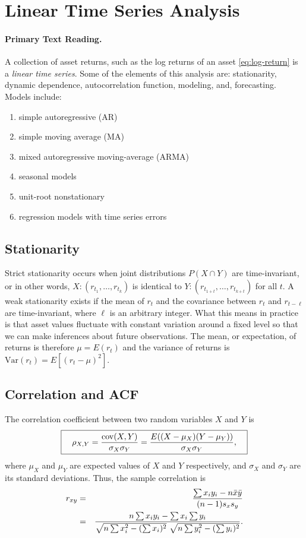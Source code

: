 \section{Linear Time Series Analysis}
\paragraph{Primary Text Reading.} 

A collection of asset returns, such as the log returns of an asset \eqref{eq:log-return} is a \emph{linear time series}. Some of the elements of this analysis are: stationarity, dynamic dependence, autocorrelation function, modeling, and, forecasting. Models include:
\begin{enumerate}
\item simple autoregressive (AR)
\item simple moving average (MA)
\item mixed autoregressive moving-average (ARMA)
\item seasonal models
\item unit-root nonstationary
\item regression models with time series errors
\end{enumerate}

\subsection{Stationarity}
Strict stationarity occurs when joint distributions $P(X \cap Y)$ are time-invariant, or in other words, $X:(r_{t_1}, \ldots, r_{t_k})$ is identical to $Y:(r_{t_{1+t}}, \ldots, r_{t_{k+t}})$ for all $t$. A weak stationarity exists if the mean of $r_t$ and the covariance between $r_t$ and $r_{t-\ell}$ are time-invariant, where $\ell$ is an arbitrary integer. What this means in practice is that asset values fluctuate with constant variation around a fixed level so that we can make inferences about future observations. The mean, or expectation, of returns is therefore $\mu = E(r_t)$ and the variance of returns is $\text{Var}(r_t) = E[(r_t - \mu)^2]$.

\subsection{Correlation and ACF}
The correlation coefficient between two random variables $X$ and $Y$ is
\[
\boxed{\quad \rho_{X,Y}={\mathrm{cov}(X,Y) \over \sigma_X \sigma_Y} ={E((X-\mu_X)(Y-\mu_Y)) \over \sigma_X\sigma_Y}, \quad}
\]
where $\mu_X$ and $\mu_Y$ are expected values of $X$ and $Y$ respectively, and $\sigma_X$ and $\sigma_Y$ are its standard deviations. Thus, the sample correlation is
\begin{eqnarray}
r_{xy}&=&\frac{\sum x_iy_i-n \bar{x} \bar{y}}{(n-1) s_x s_y} \\
\smallskip
&=&\frac{n\sum x_iy_i-\sum x_i\sum y_i} {\sqrt{n\sum x_i^2-(\sum x_i)^2}~\sqrt{n\sum y_i^2-(\sum y_i)^2}}. \notag
\end{eqnarray}

